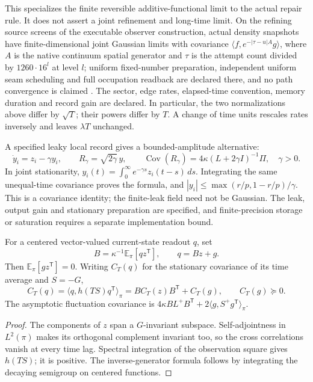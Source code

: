 This specializes the finite reversible additive-functional limit
\cite{KipnisVaradhanNative} to the actual repair rule. It does not assert a joint refinement and long-time
limit. On the refining source screens of the executable observer
construction, actual density snapshots have finite-dimensional joint
Gaussian limits with covariance \(\langle f,e^{-|\tau-u|A}g\rangle\), where
\(A\) is the native continuum spatial generator and \(\tau\) is the attempt
count divided by \(1260\cdot16^{l}\) at level \(l\); uniform fixed-number
preparation, independent uniform seam scheduling and full occupation readback
are declared there, and no path convergence is claimed
\cite{ophtimefields}. The sector, edge rates, elapsed-time convention, memory duration and
record gain are declared. In particular, the two normalizations above
differ by \(\sqrt T\); their powers differ by \(T\). A change of time
units rescales rates inversely and leaves \(\lambda T\) unchanged.

A specified leaky local record gives a bounded-amplitude alternative:
\[
 \dot y_i=z_i-\gamma y_i,\qquad R_\gamma=\sqrt{2\gamma}\,y,
 \qquad \operatorname{Cov}(R_\gamma)
   =4\kappa(L+2\gamma I)^{-1}\Pi,\quad \gamma>0.
\]
In joint stationarity, \(y_i(t)=\int_0^\infty e^{-\gamma s}z_i(t-s)\,ds\).
Integrating the same unequal-time covariance proves the formula, and
\(|y_i|\le\max(r/p,1-r/p)/\gamma\). This is a covariance identity;
the finite-leak field need not be Gaussian. The leak, output gain and
stationary preparation are specified, and finite-precision storage or
saturation requires a separate implementation bound.

\begin{theorem}
For a centered vector-valued current-state readout \(q\), set
\[
 B=\kappa^{-1}\mathbb E_\pi[qz^{\mathsf T}],\qquad q=Bz+g.
\]
Then \(\mathbb E_\pi[gz^{\mathsf T}]=0\). Writing \(C_T(q)\) for the
stationary covariance of its time average and \(S=-G\),
\[
 C_T(q)=\langle q,h(TS)q^{\mathsf T}\rangle_\pi
       =B C_T(z) B^{\mathsf T}+C_T(g),\qquad C_T(g)\succeq0.
\]
The asymptotic fluctuation covariance is
\(4\kappa BL^+B^{\mathsf T}+2\langle g,S^+g^{\mathsf T}\rangle_\pi\).
\end{theorem}
\begin{proof}
The components of \(z\) span a \(G\)-invariant subspace. Self-adjointness
in \(L^2(\pi)\) makes its orthogonal complement invariant too, so the
cross correlations vanish at every time lag. Spectral integration of the
observation square gives \(h(TS)\); it is positive. The inverse-generator
formula follows by integrating the decaying semigroup on centered functions.
\end{proof}

